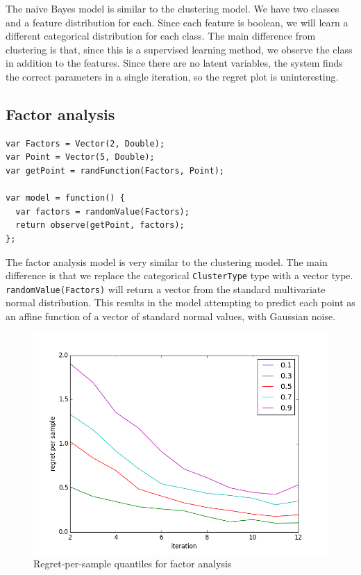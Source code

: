 \documentclass{article}
\begin{document}
The naive Bayes model is similar to the clustering model.  We have two classes and a feature
distribution for each.  Since each feature is boolean, we will learn
a different categorical distribution for each class.  The main difference from clustering is that,
since this is a supervised learning method, we observe the class in addition to the features.  Since there
are no latent variables, the system finds the correct parameters in a single iteration, so the regret plot is uninteresting.

  \subsection{Factor analysis}
{\small
\begin{lstlisting}
var Factors = Vector(2, Double);
var Point = Vector(5, Double);
var getPoint = randFunction(Factors, Point);

var model = function() {
  var factors = randomValue(Factors);
  return observe(getPoint, factors);
};
\end{lstlisting}
}

The factor analysis model is very similar to the clustering model.  The main difference is that we replace the categorical \texttt{ClusterType} type with a vector type.  \texttt{randomValue(Factors)} will return a vector from the standard multivariate normal distribution.  This results in the model attempting to predict each point as an affine function of a vector of standard normal values, with Gaussian noise.

  \begin{figure}[h]
\begin{center}
  \includegraphics[scale=0.5]{../plots/accuracy_factor_analysis.png}
\end{center}
\caption{Regret-per-sample quantiles for factor analysis}
\end{figure}
\end{document}
